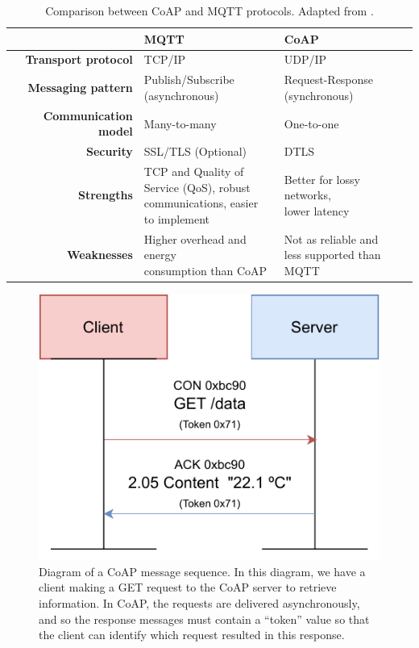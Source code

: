 \renewcommand{\arraystretch}{1.5}
\begin{table}[H]
    \centering
    \caption[Comparison between \acs{CoAP} and \acs{MQTT} protocols.]{Comparison between \acs{CoAP} and \acs{MQTT} protocols. Adapted from \cite{10.5555/3161403}.}
    \begin{tabular}{r|l|l}
        & \textbf{\acs{MQTT}}& \textbf{\acs{CoAP}}  \\ \hline
        \textbf{Transport protocol} & TCP/IP & UDP/IP \\
        \textbf{Messaging pattern} & \makecell{Publish/Subscribe \\ (asynchronous)} & \makecell{Request-Response \\ (synchronous)} \\
        \textbf{Communication model} & Many-to-many & One-to-one \\
        \textbf{Security} & SSL/TLS (Optional) & DTLS \\
        \textbf{Strengths} & \makecell{TCP and Quality of \\ Service (QoS), robust \\communications, easier \\ to implement } & \makecell{Better for lossy networks,\\ lower latency} \\
        \textbf{Weaknesses} & \makecell{Higher overhead and energy\\ consumption than \acs{CoAP}} & \makecell{Not as reliable and \\less supported than MQTT} \\
    \end{tabular}
    \label{tab:comparsion-applicationprotocols}
\end{table} 
\renewcommand{\arraystretch}{1}


\begin{figure}[H]
    \centering
    \includegraphics[width=0.5\linewidth]{images/coap message sequence diagram.pdf}
    \caption[Diagram of a \acs{CoAP} message sequence.]{ Diagram of a \acs{CoAP} message sequence. In this diagram, we have a client making a GET request to the \acs{CoAP} server to retrieve information. In \acs{CoAP}, the requests are delivered asynchronously, and so the response messages must contain a ``token'' value so that the client can identify which request resulted in this response.}
    \label{fig:coap-message-sequence-diagram}
\end{figure}

